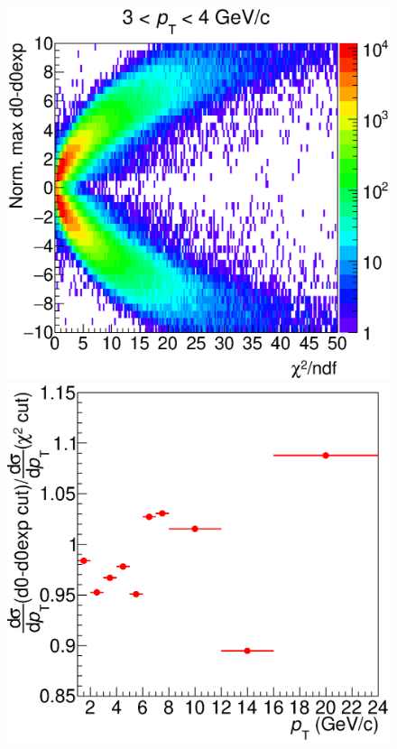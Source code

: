 \documentclass[b5paper,10pt,twoside,oldstyle,classica]{toptesi}
\begin{document}
\begin{figure}[tb]
\begin{center}
{\includegraphics[scale = 0.31]{ScatterPlotAll_11-12_Pt_3-4.eps}}
\hspace{-0.2cm}
{\includegraphics[scale = 0.31]{Ratio_cutset1_cutsettopo.eps}}

\end{center}
\end{figure}
\end{document}
